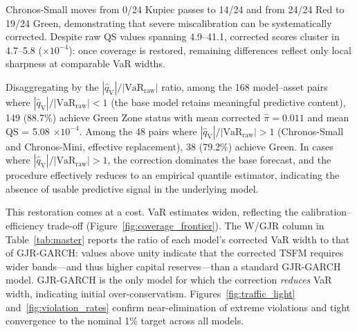 \documentclass[preprint,11pt,authoryear]{elsarticle}
\newcommand{\VaR}{\mathrm{VaR}}
\newcommand{\1}{\boldsymbol{1}}
\newcommand{\qV}{\hat{q}_{\scriptscriptstyle\mathrm{V}}}
\begin{document}
	Chronos-Small moves from 0/24 Kupiec passes to 14/24 and from
	24/24 Red to 19/24 Green, demonstrating that severe
	miscalibration can be systematically corrected. Despite raw QS
	values spanning 4.9--41.1, corrected scores cluster in
	4.7--5.8 ($\times 10^{-4}$): once coverage is restored,
	remaining differences reflect only local sharpness at
	comparable VaR widths.
	
	Disaggregating by the $|\qV|/|\VaR_{\mathrm{raw}}|$
	ratio, among the 168 model--asset pairs where
	$|\qV|/|\VaR_{\mathrm{raw}}| < 1$ (the base model retains
	meaningful predictive content), 149 (88.7\%) achieve Green Zone
	status with mean corrected $\hat\pi = 0.011$ and mean
	QS = 5.08 $\times 10^{-4}$. Among the 48 pairs where
	$|\qV|/|\VaR_{\mathrm{raw}}| > 1$ (Chronos-Small and
	Chronos-Mini, effective replacement), 38 (79.2\%) achieve Green.
	In cases where $|\qV|/|\VaR_{\mathrm{raw}}| > 1$, the correction dominates the base forecast, and the procedure effectively reduces to an empirical quantile estimator, indicating the absence of usable predictive signal in the underlying model.

	This restoration comes at a cost. VaR estimates widen, reflecting
	the calibration--efficiency trade-off
	(Figure~\ref{fig:coverage_frontier}). The W/GJR column in
	Table~\ref{tab:master} reports the ratio of each model's
	corrected VaR width to that of GJR-GARCH: values above unity
	indicate that the corrected TSFM requires wider bands---and
	thus higher capital reserves---than a standard GJR-GARCH model.
	GJR-GARCH is the only model for which the correction
	\emph{reduces} VaR width, indicating initial over-conservatism.
	Figures~\ref{fig:traffic_light} and~\ref{fig:violation_rates}
	confirm near-elimination of extreme violations and tight
	convergence to the nominal 1\% target across all models.
	
\end{document}
